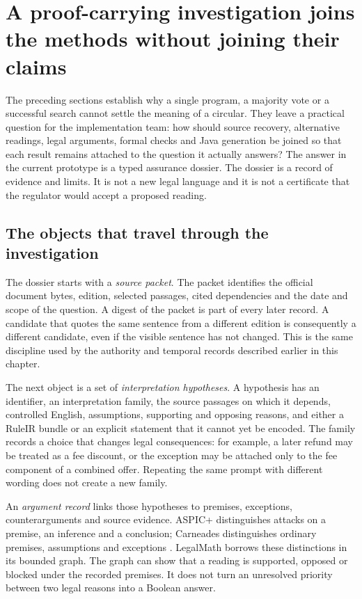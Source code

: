 \section{A proof-carrying investigation joins the methods without joining their claims}
\label{sec:proof-carrying-integration}

The preceding sections establish why a single program, a majority vote or a
successful search cannot settle the meaning of a circular. They leave a
practical question for the implementation team: how should source recovery,
alternative readings, legal arguments, formal checks and Java generation be
joined so that each result remains attached to the question it actually
answers? The answer in the current prototype is a typed assurance dossier.
The dossier is a record of evidence and limits. It is not a new legal language
and it is not a certificate that the regulator would accept a proposed reading.

\subsection{The objects that travel through the investigation}

The dossier starts with a \emph{source packet}. The packet identifies the
official document bytes, edition, selected passages, cited dependencies and
the date and scope of the question. A digest of the packet is part of every
later record. A candidate that quotes the same sentence from a different
edition is consequently a different candidate, even if the visible sentence
has not changed. This is the same discipline used by the authority and
temporal records described earlier in this chapter.

The next object is a set of \emph{interpretation hypotheses}. A hypothesis has
an identifier, an interpretation family, the source passages on which it
depends, controlled English, assumptions, supporting and opposing reasons, and
either a RuleIR bundle or an explicit statement that it cannot yet be encoded.
The family records a choice that changes legal consequences: for example, a
later refund may be treated as a fee discount, or the exception may be attached
only to the fee component of a combined offer. Repeating the same prompt with
different wording does not create a new family.

An \emph{argument record} links those hypotheses to premises, exceptions,
counterarguments and source evidence. ASPIC+ distinguishes attacks on a
premise, an inference and a conclusion; Carneades distinguishes ordinary
premises, assumptions and exceptions \citep[secs.~2--3]{aspic2010}
\citep[secs.~3--6]{carneades2007}. LegalMath borrows these distinctions in its
bounded graph. The graph can show that a reading is supported, opposed or
blocked under the recorded premises. It does not turn an unresolved priority
between two legal reasons into a Boolean answer.

